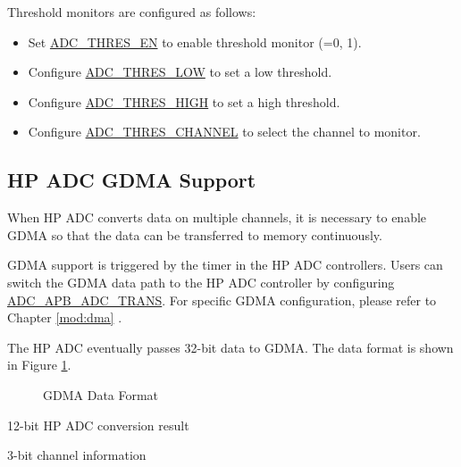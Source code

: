 \documentclass[main\_\_EN.tex]{subfiles}
\begin{document}
Threshold monitors are configured as follows:

\begin{itemize}
    \item Set \hyperref[fielddesc:ADCTHRES0EN]{ADC\_THRES\_EN} to enable threshold monitor  (=0, 1).
    \item Configure \hyperref[fielddesc:ADCTHRES0LOW]{ADC\_THRES\_LOW} to set a low threshold.
    \item Configure \hyperref[fielddesc:ADCTHRES0LOW]{ADC\_THRES\_HIGH} to set a high threshold.
    \item Configure \hyperref[fielddesc:ADCTHRES0LOW]{ADC\_THRES\_CHANNEL} to select the channel to monitor.
\end{itemize}

\subsection{HP ADC GDMA Support}

When HP ADC converts data on multiple channels, it is necessary to enable GDMA so that the data can be transferred to memory continuously.

GDMA support is triggered by the timer in the HP ADC controllers. Users can switch the GDMA data path to the HP ADC controller by configuring \hyperref[fielddesc:ADCAPBADCTRANS]{ADC\_APB\_ADC\_TRANS}. For specific GDMA configuration, please refer to Chapter \ref{mod:dma} \textit{}.

The HP ADC eventually passes 32-bit data to GDMA. The data format is shown in Figure \ref{fig:sensor-dma-data-format}.

\begin{figure}[H]
\centering
{}%
%
%
%
\end{figure}
\vspace{-2em}
\begin{figure}[H]
    \centering
    \caption{GDMA Data Format}
    \label{fig:sensor-dma-data-format}
\end{figure}
\vspace{-2em}
\begin{regdesc}\begin{reglist}
\item [data] 12-bit HP ADC conversion result
\item [ch\_sel] 3-bit channel information
\end{reglist}\end{regdesc}
\end{document}
